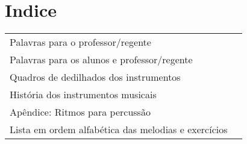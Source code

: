 \section*{Indice}


\begin{table}[ht]
  \centering
  \begin{tabular}{p{15cm}l}

    Palavras para o professor/regente & \textbf{ \pageref{sec:palavras-professor-regente}} \\
    Palavras para os alunos e professor/regente  &  \textbf{ \pageref{sec:palavras-alunos-professor}}\\
    Quadros de dedilhados dos instrumentos  &  \textbf{ \pageref{sec:sec:quadro-de-dedilhado}}\\
    História dos instrumentos musicais   &   \textbf{ \pageref{sec:sec:hist-dos-instrumentos}}\\
    Apêndice: Ritmos para percussão   &  \textbf{ \pageref{sec:apendice-ritmos}}\\
    Lista em ordem alfabética das melodias e exercícios  &  \textbf{ \pageref{sec:lista-ordem-alfabetica}}\\

  \end{tabular}
\end{table}



